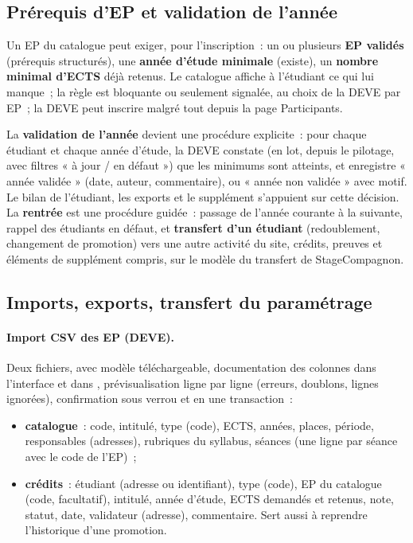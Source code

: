 \documentclass[11pt,a4paper]{article}
\newcommand{\code}[1]{\texttt{\detokenize{#1}}}
\begin{document}
\subsection{Prérequis d'EP et validation de l'année}\label{sec:prerequis}

Un EP du catalogue peut exiger, pour l'inscription~: un ou plusieurs \textbf{EP validés}
(prérequis structurés), une \textbf{année d'étude minimale} (existe), un \textbf{nombre
minimal d'ECTS} déjà retenus. Le catalogue affiche à l'étudiant ce qui lui manque~; la
règle est bloquante ou seulement signalée, au choix de la DEVE par EP~; la DEVE peut
inscrire malgré tout depuis la page Participants.

La \textbf{validation de l'année} devient une procédure explicite~: pour chaque étudiant
et chaque année d'étude, la DEVE constate (en lot, depuis le pilotage, avec filtres « à
jour / en défaut ») que les minimums sont atteints, et enregistre « année validée » (date,
auteur, commentaire), ou « année non validée » avec motif. Le bilan de l'étudiant, les
exports et le supplément s'appuient sur cette décision. La \textbf{rentrée} est une
procédure guidée~: passage de l'année courante à la suivante, rappel des étudiants en
défaut, et \textbf{transfert d'un étudiant} (redoublement, changement de promotion) vers
une autre activité \code{mod_ep} du site, crédits, preuves et éléments de supplément
compris, sur le modèle du transfert de StageCompagnon.

\subsection{Imports, exports, transfert du paramétrage}\label{sec:transfert}

\paragraph{Import CSV des EP (DEVE).} Deux fichiers, avec modèle téléchargeable,
documentation des colonnes dans l'interface et dans \code{INSTALL.md}, prévisualisation
ligne par ligne (erreurs, doublons, lignes ignorées), confirmation sous verrou et en une
transaction~:
\begin{itemize}
  \item \textbf{catalogue}~: code, intitulé, type (code), ECTS, années, places, période,
    responsables (adresses), rubriques du syllabus, séances (une ligne par séance avec le
    code de l'EP)~;
  \item \textbf{crédits}~: étudiant (adresse ou identifiant), type (code), EP du catalogue
    (code, facultatif), intitulé, année d'étude, ECTS demandés et retenus, note, statut,
    date, validateur (adresse), commentaire. Sert aussi à reprendre l'historique d'une
    promotion.
\end{itemize}
\end{document}

